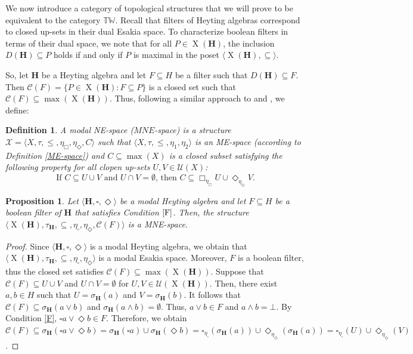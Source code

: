 \documentclass[pdflatex,sn-mathphys-num]{sn-jnl}%
\newcommand{\He}{\mathbf{H}}
\newcommand{\X}[1]{\operatorname{X}(#1)}
\theoremstyle{thmstyleone}%
\newtheorem{proposition}[theorem]{Proposition}%
\theoremstyle{thmstyletwo}%
\theoremstyle{thmstylethree}%
\newtheorem{definition}{Definition}%
\begin{document}
We now introduce a category of topological structures that we will prove to be equivalent to the category $\mathbb{TW}$. Recall that filters of Heyting algebras correspond to closed up-sets in their dual Esakia space. To characterize boolean filters in terms of their dual space, we note that for all  $P \in \X{\He}$, the inclusion $D(\He) \subseteq P$ holds if and only if $P$ is maximal in the poset $\langle \X{\He}, \subseteq \rangle$.

So, let $\He$ be a Heyting algebra and let $F\subseteq H$ be a filter such that $D(\He)\subseteq F$. Then $\mathcal{C}(F)=\{P\in \X{\He}:F\subseteq P\}$ is a closed set such that $\mathcal{C}(F)\subseteq \max(\X{\He})$. Thus, following a similar approach to \cite{JanRivi2014} and \cite{Jansana2}, we define:

\begin{definition}
A modal NE-space ($MNE$-space) is a structure $\mathcal{X} = \langle X, \tau,\leq, \eta_\Box, \eta_\Diamond, C\rangle$ such that $\langle X, \tau, \leq,\eta_1,\eta_2 \rangle$ is an ME-space (according to Definition \ref{ME-space}) and $C\subseteq\max(X)$ is a closed subset satisfying the following property for all clopen up-sets $U, V \in \mathcal{U}(X)$:
\begin{equation}\label{F*}
    \text{If }C \subseteq U \cup V\text{ and }U \cap V = \emptyset\text{, then }C \subseteq \Box_{\eta_\Box} U \cup \Diamond_{\eta_\Diamond}V. \tag{$F^*$}
\end{equation}
\end{definition}


\begin{proposition}
    Let $\langle \He,\square,\Diamond\rangle$ be a modal Heyting algebra and let $F\subseteq H$ be a boolean filter of $\He$ that satisfies Condition $\eqref{F}$. Then, the structure $\langle \X{\He},\tau_\He,\subseteq,\eta_\square,\eta_\Diamond,\mathcal{C}(F)\rangle$ is a MNE-space.
\end{proposition}

\begin{proof}
    Since $\langle \He,\square,\Diamond\rangle$ is a modal Heyting algebra, we obtain that $\langle \X{\He},\tau_{\He},\subseteq,\eta_{\square},\eta_{\Diamond}\rangle$ is a modal Esakia space. Moreover, $F$ is a boolean filter, thus the closed set satisfies $\mathcal{C}(F)\subseteq \max(\X{\He})$. Suppose that $\mathcal{C}(F) \subseteq U \cup V$ and $U \cap V = \emptyset$ for $U,V\in\mathcal{U}(\X{\He})$. Then, there exist $a,b\in H$ such that $U=\sigma_{\He}(a)$ and $V=\sigma_{\He}(b)$. It follows that $\mathcal{C}(F)\subseteq \sigma_{\He}(a\vee b)$ and $\sigma_{\He}(a\wedge b)=\emptyset$. Thus, $a\vee b\in F$ and $a\wedge b=\bot$. By Condition \eqref{F}, $\square a\vee\Diamond b\in F$. Therefore, we obtain $\mathcal{C}(F)\subseteq \sigma_{\He}(\square a\vee \Diamond b)=\sigma_{\He}(\square a)\cup \sigma_{\He}( \Diamond b)=\square_{\eta_{\square}}(\sigma_{\He}(a))\cup \Diamond_{\eta_{\Diamond}}(\sigma_{\He}(a))=\square_{\eta_{\square}}(U)\cup \Diamond_{\eta_{\Diamond}}(V)$.
\end{proof}
\end{document}
